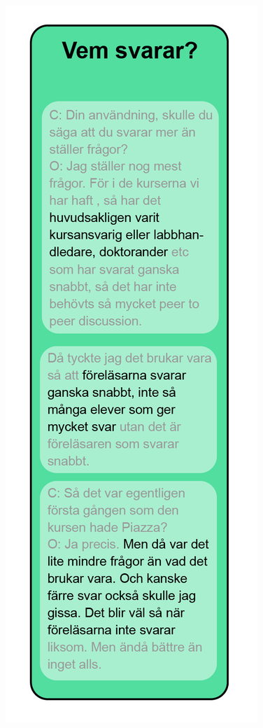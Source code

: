 \begin{figure}[hbtp]
    \centering
    \includegraphics[scale=0.75,angle=90]{appendix/appendix_green/part2b.png}
    \caption*{}
    \label{fig:nr8_part5}
\end{figure}

